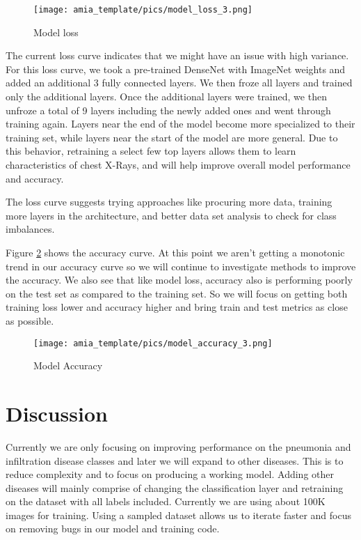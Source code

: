 \documentclass{amia}
\begin{document}
\begin{figure}[h!]
\centering
\texttt{[image: amia\_template/pics/model\_loss\_3.png]}
\caption{Model loss}
\label{fig1}
\end{figure}

The current loss curve indicates that we might have an issue with high variance. For this loss curve, we took a pre-trained DenseNet with ImageNet weights and added an additional 3 fully connected layers. We then froze all layers and trained only the additional layers. Once the additional layers were trained, we then unfroze a total of 9 layers including the newly added ones and went through training again. Layers near the end of the model become more specialized to their training set, while layers near the start of the model are more general. Due to this behavior, retraining a select few top layers allows them to learn characteristics of chest X-Rays, and will help improve overall model performance and accuracy.

The loss curve suggests trying approaches like procuring more data, training more layers in the architecture, and better data set analysis to check for class imbalances.

Figure \ref{fig2} shows the accuracy curve. At this point we aren't getting a monotonic trend in our accuracy curve so we will continue to investigate methods to improve the accuracy. We also see that like model loss, accuracy also is performing poorly on the test set as compared to the training set. So we will focus on getting both training loss lower and accuracy higher and bring train and test metrics as close as possible.

\begin{figure}[h!]
\centering
\texttt{[image: amia\_template/pics/model\_accuracy\_3.png]}
\caption{Model Accuracy}
\label{fig2}
\end{figure}


\section*{Discussion}

Currently we are only focusing on improving performance on the pneumonia and infiltration disease classes and later we will expand to other diseases. This is to reduce complexity and to focus on producing a working model. Adding other diseases will mainly comprise of changing the classification layer and retraining on the dataset with all labels included. Currently we are using about 100K images for training. Using a sampled dataset allows us to iterate faster and focus on removing bugs in our model and training code.
\end{document}
